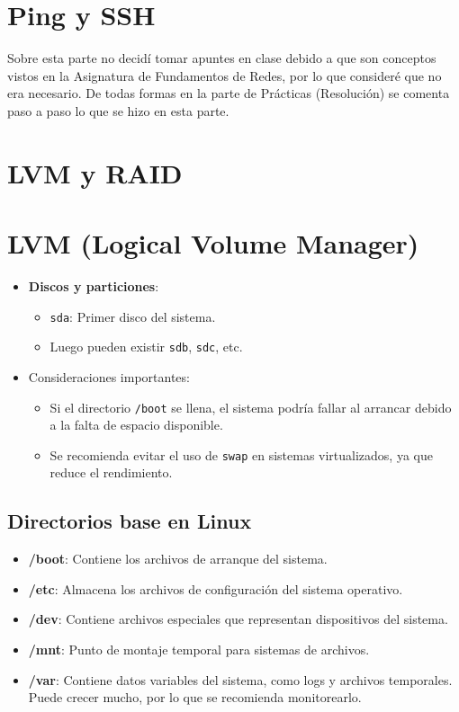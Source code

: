\section{Ping y SSH}

Sobre esta parte no decidí tomar apuntes en clase debido a que son conceptos vistos en la Asignatura de Fundamentos de Redes, por lo que consideré que no era necesario. De todas formas en la parte de Prácticas (Resolución) se comenta paso a paso lo que se hizo en esta parte.

\section{LVM y RAID}

\section{LVM (Logical Volume Manager)}

\begin{itemize}
    \item \textbf{Discos y particiones}:
    \begin{itemize}
        \item \texttt{sda}: Primer disco del sistema.
        \item Luego pueden existir \texttt{sdb}, \texttt{sdc}, etc.
    \end{itemize}
    \item Consideraciones importantes:
    \begin{itemize}
        \item Si el directorio \texttt{/boot} se llena, el sistema podría fallar al arrancar debido a la falta de espacio disponible.
        \item Se recomienda evitar el uso de \texttt{swap} en sistemas virtualizados, ya que reduce el rendimiento.
    \end{itemize}
\end{itemize}

\subsection{Directorios base en Linux}
\begin{itemize}
    \item \textbf{/boot}: Contiene los archivos de arranque del sistema.
    \item \textbf{/etc}: Almacena los archivos de configuración del sistema operativo.
    \item \textbf{/dev}: Contiene archivos especiales que representan dispositivos del sistema.
    \item \textbf{/mnt}: Punto de montaje temporal para sistemas de archivos.
    \item \textbf{/var}: Contiene datos variables del sistema, como logs y archivos temporales. Puede crecer mucho, por lo que se recomienda monitorearlo.
\end{itemize}

